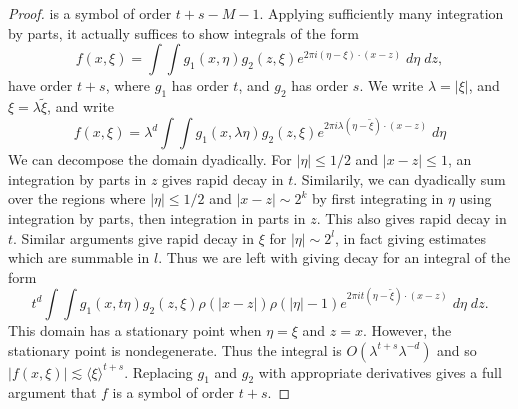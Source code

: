 \begin{proof}
    is a symbol of order $t + s - M - 1$. Applying sufficiently many integration by parts, it actually suffices to show integrals of the form
    \[ f(x,\xi) = \int \int g_1(x,\eta) g_2(z,\xi) e^{2 \pi i (\eta - \xi) \cdot (x - z)}\; d\eta\; dz, \]
    have order $t + s$, where $g_1$ has order $t$, and $g_2$ has order $s$. We write $\lambda = |\xi|$, and $\xi = \lambda \tilde{\xi}$, and write
    \[ f(x,\xi) = \lambda^d \int \int g_1(x, \lambda \eta) g_2(z, \xi) e^{2 \pi i \lambda (\eta - \tilde{\xi}) \cdot (x - z)}\; d\eta \]
    We can decompose the domain dyadically. For $|\eta| \leq 1/2$ and $|x - z| \leq 1$, an integration by parts in $z$ gives rapid decay in $t$. Similarily, we can dyadically sum over the regions where $|\eta| \leq 1/2$ and $|x - z| \sim 2^k$ by first integrating in $\eta$ using integration by parts, then integration in parts in $z$. This also gives rapid decay in $t$. Similar arguments give rapid decay in $\xi$ for $|\eta| \sim 2^l$, in fact giving estimates which are summable in $l$. Thus we are left with giving decay for an integral of the form
    \[ t^d \int \int g_1(x, t \eta) g_2(z,\xi) \rho(|x - z|) \rho(|\eta| - 1) e^{2 \pi i t (\eta - \tilde{\xi}) \cdot (x - z)}\; d\eta\; dz. \]
    This domain has a stationary point when $\eta = \xi$ and $z = x$. However, the stationary point is nondegenerate. Thus the integral is $O(\lambda^{t + s} \lambda^{-d})$ and so $|f(x,\xi)| \lesssim \langle \xi \rangle^{t + s}$. Replacing $g_1$ and $g_2$ with appropriate derivatives gives a full argument that $f$ is a symbol of order $t + s$.
\end{proof}

